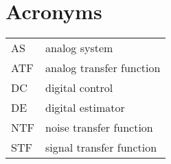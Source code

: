 \section*{Acronyms}
\begin{tabular}{ p{2cm} l }
    AS         &  analog system \\
    ATF        &  analog transfer function \\
    DC         &  digital control \\
    DE         &  digital estimator \\
    NTF        &  noise transfer function \\
    STF        &  signal transfer function \\

\end{tabular}
